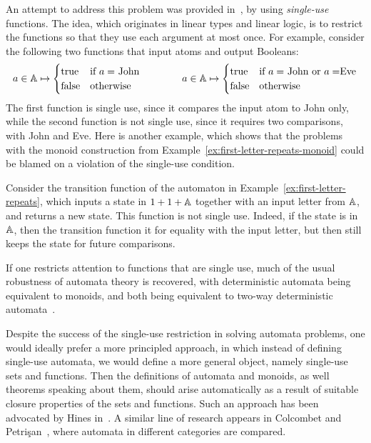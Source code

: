 An attempt to address this problem was provided in~\cite{stefansk-msc,stefanski-phd,bojanczykstefanski2020}, by using \emph{single-use} functions. The idea, which originates in linear types and linear logic,  is to restrict the functions so that they use each argument at most once. For example, consider the following two functions that input atoms and output Booleans:
\begin{align*}
a \in \mathbb A \mapsto 
\begin{cases}
    \text{true} & \text{if $a=$ John}\\
    \text{false} & \text{otherwise}
\end{cases}
\qquad \qquad 
a \in \mathbb A \mapsto 
\begin{cases}
    \text{true} & \text{if $a=$ John or $a = $Eve}\\
    \text{false} & \text{otherwise}
\end{cases}
\end{align*}
The first function is single use, since it compares the input atom to John only, while the second function is not single use, since it requires two comparisons, with John and Eve. Here is another example, which shows that the problems with the monoid construction from Example~\ref{ex:first-letter-repeats-monoid} could be blamed on a violation of the single-use condition.
\begin{example}
    Consider  the transition function of the automaton in Example~\ref{ex:first-letter-repeats}, which inputs a state in $1 + 1 + \mathbb A$ together with an input letter from $\mathbb A$, and returns a new state.  This function is not single use. Indeed, if the state is in $\mathbb A$, then the transition function it for equality with the input letter, but then still keeps the state for future comparisons. \exampleend
\end{example}

If one restricts attention to functions that are single use, much of the usual robustness of automata theory is recovered, with deterministic automata being equivalent to monoids, and both being equivalent to two-way deterministic automata~\cite{bojanczykstefanski2020}.

Despite the success of the single-use restriction in solving automata problems, one would ideally prefer a more principled approach, in which instead of defining single-use automata, we would define a more general object, namely single-use sets and functions. Then the definitions of  automata and monoids, as well theorems speaking about them, should arise automatically as a result of suitable closure properties of the sets and functions. Such an approach has been advocated by Hines in~\cite{hines2003categorical}. A similar line of research  appears in Colcombet and Petrişan~\cite{colcombet2020automata}, where automata in different categories are compared.

